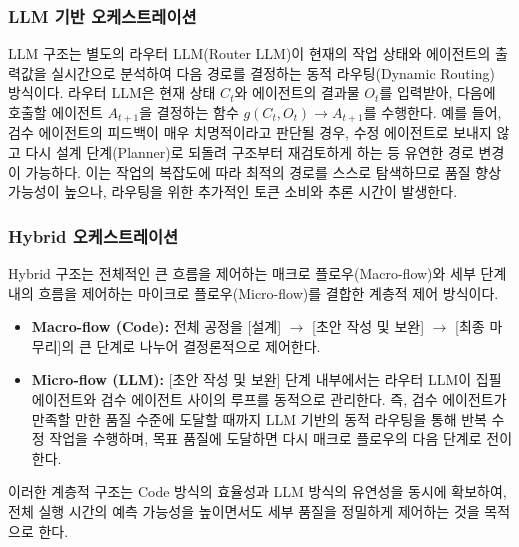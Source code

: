 \subsubsection{LLM 기반 오케스트레이션}
LLM 구조는 별도의 라우터 LLM(Router LLM)이 현재의 작업 상태와 에이전트의 출력값을 실시간으로 분석하여 다음 경로를 결정하는 동적 라우팅(Dynamic Routing) 방식이다. 라우터 LLM은 현재 상태 $C_t$와 에이전트의 결과물 $O_t$를 입력받아, 다음에 호출할 에이전트 $A_{t+1}$을 결정하는 함수 $g(C_t, O_t) \rightarrow A_{t+1}$를 수행한다. 예를 들어, 검수 에이전트의 피드백이 매우 치명적이라고 판단될 경우, 수정 에이전트로 보내지 않고 다시 설계 단계(Planner)로 되돌려 구조부터 재검토하게 하는 등 유연한 경로 변경이 가능하다. 이는 작업의 복잡도에 따라 최적의 경로를 스스로 탐색하므로 품질 향상 가능성이 높으나, 라우팅을 위한 추가적인 토큰 소비와 추론 시간이 발생한다.

\subsubsection{Hybrid 오케스트레이션}
Hybrid 구조는 전체적인 큰 흐름을 제어하는 매크로 플로우(Macro-flow)와 세부 단계 내의 흐름을 제어하는 마이크로 플로우(Micro-flow)를 결합한 계층적 제어 방식이다. 
\begin{itemize}
    \item \textbf{Macro-flow (Code):} 전체 공정을 [설계] $\rightarrow$ [초안 작성 및 보완] $\rightarrow$ [최종 마무리]의 큰 단계로 나누어 결정론적으로 제어한다.
    \item \textbf{Micro-flow (LLM):} [초안 작성 및 보완] 단계 내부에서는 라우터 LLM이 집필 에이전트와 검수 에이전트 사이의 루프를 동적으로 관리한다. 즉, 검수 에이전트가 만족할 만한 품질 수준에 도달할 때까지 LLM 기반의 동적 라우팅을 통해 반복 수정 작업을 수행하며, 목표 품질에 도달하면 다시 매크로 플로우의 다음 단계로 전이한다.
\end{itemize}
이러한 계층적 구조는 Code 방식의 효율성과 LLM 방식의 유연성을 동시에 확보하여, 전체 실행 시간의 예측 가능성을 높이면서도 세부 품질을 정밀하게 제어하는 것을 목적으로 한다.